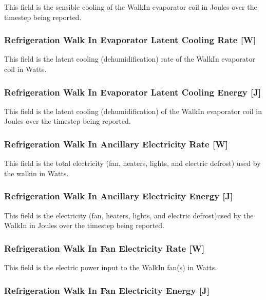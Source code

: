 This field is the sensible cooling of the WalkIn evaporator coil in Joules over the timestep being reported.

\subsubsection{Refrigeration Walk In Evaporator Latent Cooling Rate {[}W{]}}\label{refrigeration-walk-in-evaporator-latent-cooling-rate-w}

This field is the latent cooling (dehumidification) rate of the WalkIn evaporator coil in Watts.

\subsubsection{Refrigeration Walk In Evaporator Latent Cooling Energy {[}J{]}}\label{refrigeration-walk-in-evaporator-latent-cooling-energy-j}

This field is the latent cooling (dehumidification) of the WalkIn evaporator coil in Joules over the timestep being reported.

\subsubsection{Refrigeration Walk In Ancillary Electricity Rate {[}W{]}}\label{refrigeration-walk-in-ancillary-electric-power-w}

This field is the total electricity (fan, heaters, lights, and electric defrost) used by the walkin in Watts.

\subsubsection{Refrigeration Walk In Ancillary Electricity Energy {[}J{]}}\label{refrigeration-walk-in-ancillary-electric-energy-j}

This field is the electricity (fan, heaters, lights, and electric defrost)used by the WalkIn in Joules over the timestep being reported.

\subsubsection{Refrigeration Walk In Fan Electricity Rate {[}W{]}}\label{refrigeration-walk-in-fan-electric-power-w}

This field is the electric power input to the WalkIn fan(s) in Watts.

\subsubsection{Refrigeration Walk In Fan Electricity Energy {[}J{]}}\label{refrigeration-walk-in-fan-electric-energy-j}

